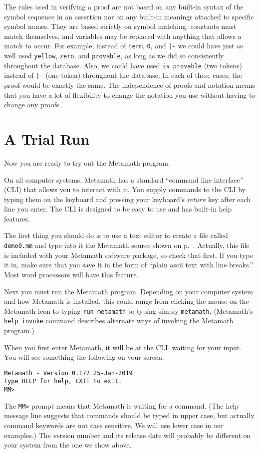 The rules used in verifying a proof are not based on any built-in syntax of the
symbol sequence in an assertion nor on any built-in meanings
attached to specific symbol names.  They are based strictly on symbol
matching:  constants must match themselves, and
variables may be replaced with anything that allows a match to
occur.  For example, instead of \texttt{term}, \texttt{0}, and \verb$|-$ we could
have just as well used \texttt{yellow}, \texttt{zero}, and \texttt{provable}, as long
as we did so consistently throughout the database.  Also, we could have used
\texttt{is provable} (two tokens) instead of \verb$|-$ (one token) throughout the
database.  In each of these cases, the proof would be exactly the same.  The
independence of proofs and notation means that you have a lot of flexibility to
change the notation you use without having to change any proofs.

\section{A Trial Run}\label{trialrun}

Now you are ready to try out the Metamath program.

On all computer systems, Metamath has a standard ``command line
interface'' (CLI) that allows you to
interact with it.  You supply commands to the CLI by typing them on the
keyboard and pressing your keyboard's {\em return} key after each line
you enter.  The CLI is designed to be easy to use and has built-in help
features.

The first thing you should do is to use a text editor to create a file
called \texttt{demo0.mm} and type into it the Metamath source shown on
p.~\pageref{demo0}.  Actually, this file is included with your Metamath
software package, so check that first.  If you type it in, make sure
that you save it in the form of ``plain {\sc ascii} text with line
breaks.''  Most word processors will have this feature.

Next you must run the Metamath program.  Depending on your computer
system and how Metamath is installed, this could range from clicking the
mouse on the Metamath icon to typing \texttt{run metamath} to typing
simply \texttt{metamath}.  (Metamath's {\tt help invoke} command describes
alternate ways of invoking the Metamath program.)

When you first enter Metamath, it will be at the CLI, waiting
for your input. You will see something the following on your screen:
\begin{verbatim}
Metamath - Version 0.172 25-Jan-2019
Type HELP for help, EXIT to exit.
MM>
\end{verbatim}
The \texttt{MM>} prompt means that Metamath is waiting for a command.
(The help message line suggests that commands should be typed in upper
case, but actually command keywords are not case
sensitive.  We will use lower case in our examples.)
The version number and its release date will probably be different on your
system from the one we show above.


